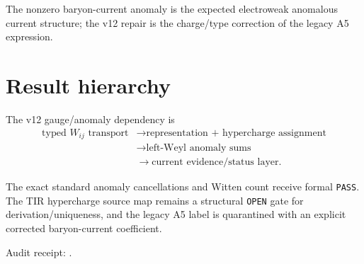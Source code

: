 The nonzero baryon-current anomaly is the expected electroweak anomalous current structure; the v12 repair is the charge/type correction of the legacy A5 expression.

\section{Result hierarchy}

The v12 gauge/anomaly dependency is
\[
\boxed{\begin{aligned}
\text{typed }W_{ij}\text{ transport}
&\to \text{representation + hypercharge assignment}\\
&\to \text{left-Weyl anomaly sums}\\
&\to \text{current evidence/status layer}.
\end{aligned}}
\]

The exact standard anomaly cancellations and Witten count receive formal \texttt{PASS}. The TIR hypercharge source map remains a structural \texttt{OPEN} gate for derivation/uniqueness, and the legacy A5 label is quarantined with an explicit corrected baryon-current coefficient.

Audit receipt:
.
